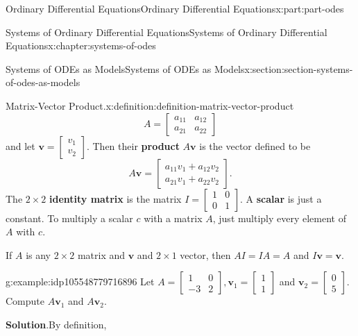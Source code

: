\documentclass[oneside,10pt,]{book}
\newcommand{\blocktitlefont}{\relax}
\newcommand{\terminology}[1]{\textbf{#1}}
\numberwithin{equation}{part}
\renewcommand{\vec}[1]{\mathbf{#1}}
\newcommand{\amp}{&}
\begin{document}
\begin{partptx}{Ordinary Differential Equations}{}{Ordinary Differential Equations}{}{}{x:part:part-odes}
\begin{chapterptx}{Systems of Ordinary Differential Equations}{}{Systems of Ordinary Differential Equations}{}{}{x:chapter:systems-of-odes}
\begin{sectionptx}{Systems of ODEs as Models}{}{Systems of ODEs as Models}{}{}{x:section:section-systems-of-odes-as-models}
\begin{definition}{Matrix-Vector Product.}{x:definition:definition-matrix-vector-product}
\begin{equation*}
A = \begin{bmatrix} a_{11}\amp a_{12}\\a_{21}\amp a_{22} \end{bmatrix}
\end{equation*}
and let \(\vec{v} = \begin{bmatrix} v_{1}\\v_{2} \end{bmatrix}\). Then their \terminology{product} \(A\vec{v}\) is the vector defined to be%
\begin{equation*}
A\vec{v} = \begin{bmatrix} a_{11}v_{1}+a_{12}v_{2}\\a_{21}v_{1}+a_{22}v_{2} \end{bmatrix}.
\end{equation*}
The \(2\times 2\) \terminology{identity matrix} is the matrix \(I = \begin{bmatrix}1\amp0\\0\amp1\end{bmatrix}\). A \terminology{scalar} is just a constant. To multiply a scalar \(c\) with a matrix \(A\), just multiply every element of \(A\) with \(c\).%
\end{definition}
If \(A\) is any \(2\times2\) matrix and \(\vec{v}\) and \(2\times1\) vector, then \(AI=IA=A\) and \(I\vec{v} = \vec{v}\).%
\begin{example}{}{g:example:idp105548779716896}%
Let \(A = \begin{bmatrix} 1\amp0\\-3\amp2 \end{bmatrix},\vec{v}_{1} = \begin{bmatrix}1\\1\end{bmatrix}\) and \(\vec{v}_{2} = \begin{bmatrix}0\\5\end{bmatrix}\). Compute \(A\vec{v}_{1}\) and \(A\vec{v}_{2}\).%
\par\smallskip%
\noindent\textbf{\blocktitlefont Solution}.\hypertarget{g:solution:idp105548779718944}{}\quad{}By definition,%
\begin{equation*}

\end{equation*}
\end{example}
\end{sectionptx}
\end{chapterptx}
\end{partptx}
\end{document}
